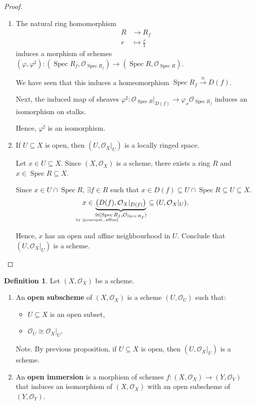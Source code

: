 \documentclass[12pt]{article}
\DeclareMathOperator{\Spec}{Spec}
\theoremstyle{definition}
\newtheorem*{definition}{Definition}
\theoremstyle{remark}
\begin{document}
\begin{proof}
\begin{enumerate}[label=\arabic*)]
\item The natural ring homomorphism
\begin{align*}
R&\longrightarrow R_f\\
r&\longmapsto\frac{r}{1}
\end{align*}
induces a morphism of schemes $(\varphi,\varphi^{\sharp}):(\Spec R_f,\mathcal{O}_{\Spec R_f})\rightarrow(\Spec R,\mathcal{O}_{\Spec R})$.

We have seen that this induces a homeomorphism $\Spec R_f\xrightarrow{\cong}D(f)$.

Next, the induced map of sheaves $\varphi^{\sharp}:\mathcal{O}_{\Spec R}|_{D(f)}\longrightarrow\varphi_x\mathcal{O}_{\Spec R_f}$ induces an isomorphism on stalks.

Hence, $\varphi^{\sharp}$ is an isomorphism.

\item If $U\subseteq X$ is open, then $(U,\mathcal{O}_X|_U)$ is a locally ringed space.

Let $x\in U\subseteq X$. Since $(X,\mathcal{O}_X)$ is a scheme, there exists a ring $R$ and $x\in\Spec R\subseteq X$.

Since $x\in U\cap\Spec R$, $\exists f\in R$ such that $x\in D(f)\subseteq U\cap\Spec R\subseteq U\subseteq X$.
\[x\in\underbrace{\big(D(f),\mathcal{O}_X|_{D(f)}\big)}_{\underset{\mathclap{\text{by \ref{principal_affine}}}}{\cong}(\Spec R_f,\mathcal{O}_{\Spec R_f})}\subseteq(U,\mathcal{O}_X|_U).\]

Hence, $x$ has an open and affine neighbourhood in $U$. Conclude that $(U,\mathcal{O}_X|_U)$ is a scheme.
\end{enumerate}
\end{proof}

\begin{definition}
Let $(X,\mathcal{O}_X)$ be a scheme.

\begin{enumerate}[label=\arabic*)]
\item An \textbf{open subscheme} of $(X,\mathcal{O}_X)$ is a scheme $(U,\mathcal{O}_U)$ such that:
\begin{itemize}[label=$-$]
\item $U\subseteq X$ is an open subset,
\item $\mathcal{O}_U\cong\mathcal{O}_X|_U$.
\end{itemize}

Note. By previous proposition, if $U\subseteq X$ is open, then $(U,\mathcal{O}_X|_U)$ is a scheme.

\item An \textbf{open immersion} is a morphism of schemes $f:(X,\mathcal{O}_X)\rightarrow(Y,\mathcal{O}_Y)$ that induces an isomorphism of $(X,\mathcal{O}_X)$ with an open subscheme of $(Y,\mathcal{O}_Y)$.
\end{enumerate}
\end{definition}
\end{document}
